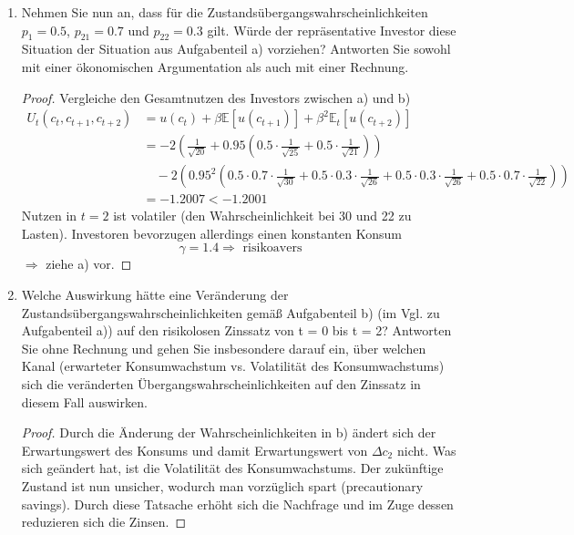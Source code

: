 \documentclass[12pt]{extreport} %
\theoremstyle{named}
\theoremstyle{nnamed}
\theoremstyle{itshape}
\theoremstyle{normal}
\begin{document}
\begin{enumerate}
\begin{proof}
\begin{align*}
						& \quad-2 \left( 0.95^2 \left( 0.25 \cdot \frac{1}{\sqrt{30}} + 0.25 \cdot \frac{1}{\sqrt{26}} + 0.25 \cdot \frac{1}{\sqrt{26}} + 0.25 \cdot \frac{1}{\sqrt{22}} \right)  \right) \\
						& = - 1.2001
			\end{align*} 
		\end{proof}
	\item Nehmen Sie nun an, dass für die Zustandsübergangswahrscheinlichkeiten $p_1 = 0.5$, $p_{21} = 0.7$ und $p_{22} = 0.3$ gilt. Würde der repräsentative Investor diese Situation der Situation aus Aufgabenteil a) vorziehen? Antworten Sie sowohl mit einer ökonomischen Argumentation als auch mit einer Rechnung.
		\begin{proof}
			Vergleiche den Gesamtnutzen des Investors zwischen a) und b)
				\begin{align*}
				U_t(c_t, c_{t+1}, c_{t+2}) & = u(c_t) + \beta \mathbb{E}[ u(c_{t+1})] + \beta^2 \mathbb{E}_t \left[ u(c_{t+2}) \right] \\
						& = -2 \left( \frac{1}{\sqrt{20}} + 0.95 \left( 0.5 \cdot \frac{1}{\sqrt{25}} + 0.5 \cdot \frac{1}{\sqrt{21}} \right)\right) \\
						& \quad-2 \left( 0.95^2 \left( 0.5 \cdot 0.7 \cdot \frac{1}{\sqrt{30}} + 0.5 \cdot 0.3 \cdot \frac{1}{\sqrt{26}} + 0.5 \cdot 0.3 \cdot \frac{1}{\sqrt{26}} + 0.5 \cdot 0.7 \cdot \frac{1}{\sqrt{22}} \right)  \right) \\
						& = - 1.2007 < -1.2001
			\end{align*} 		
			Nutzen in $t = 2$ ist volatiler (den Wahrscheinlichkeit bei 30 und 22 zu Lasten). Investoren bevorzugen allerdings einen konstanten Konsum
			$$ \gamma = 1.4 \Rightarrow \text{ risikoavers} $$
			$\Rightarrow$ ziehe a) vor.
		\end{proof}
	\item Welche Auswirkung hätte eine Veränderung der Zustandsübergangswahrscheinlichkeiten gemäß Aufgabenteil b) (im Vgl. zu Aufgabenteil a)) auf den risikolosen Zinssatz von t = 0 bis t = 2? Antworten Sie ohne Rechnung und gehen Sie insbesondere darauf ein, über welchen Kanal (erwarteter Konsumwachstum vs. Volatilität des Konsumwachstums) sich die veränderten Übergangswahrscheinlichkeiten auf den Zinssatz in diesem Fall auswirken.
		\begin{proof}
			Durch die Änderung der Wahrscheinlichkeiten in b) ändert sich der Erwartungswert des Konsums und damit Erwartungswert von $\Delta c_2$ nicht. Was sich geändert hat, ist die Volatilität des Konsumwachstums. Der zukünftige Zustand ist nun unsicher, wodurch man vorzüglich spart (precautionary savings). Durch diese Tatsache erhöht sich die Nachfrage und im Zuge dessen reduzieren sich die Zinsen.

\end{proof}
\end{enumerate}
\end{document}
